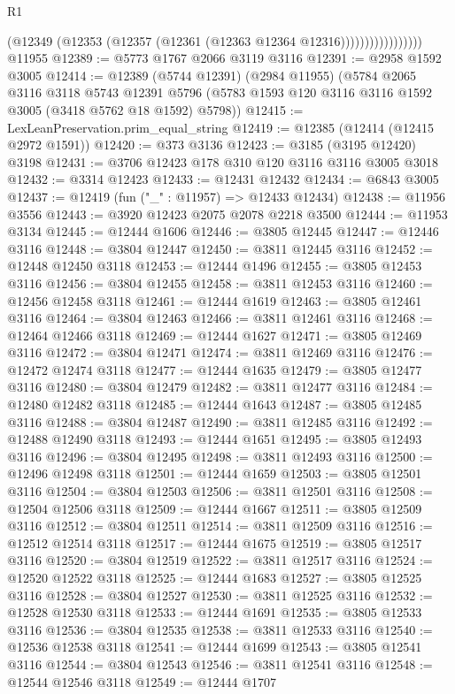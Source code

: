 \begin{lexlean}{R1}
\begin{coremodule}
                            (@12349 (@12353 (@12357 (@12361 (@12363 @12364 @12316)))))))))))))))))
    @11955
@12389 := @5773 @1767 @2066 @3119 @3116
@12391 := @2958 @1592 @3005
@12414 := @12389
    (@5744 @12391)
    (@2984 @11955)
    (@5784
      @2065
      @3116
      @3118
      @5743
      @12391
      @5796
      (@5783 @1593 @120 @3116 @3116 @1592 @3005 (@3418 @5762 @18 @1592) @5798))
@12415 := LexLeanPreservation.prim_equal_string
@12419 := @12385 (@12414 (@12415 @2972 @1591))
@12420 := @373 @3136
@12423 := @3185 (@3195 @12420) @3198
@12431 := @3706 @12423 @178 @310 @120 @3116 @3116 @3005 @3018
@12432 := @3314 @12423
@12433 := @12431 @12432
@12434 := @6843 @3005
@12437 := @12419 (fun ("_" : @11957) => @12433 @12434)
@12438 := @11956 @3556
@12443 := @3920 @12423 @2075 @2078 @2218 @3500
@12444 := @11953 @3134
@12445 := @12444 @1606
@12446 := @3805 @12445
@12447 := @12446 @3116
@12448 := @3804 @12447
@12450 := @3811 @12445 @3116
@12452 := @12448 @12450 @3118
@12453 := @12444 @1496
@12455 := @3805 @12453 @3116
@12456 := @3804 @12455
@12458 := @3811 @12453 @3116
@12460 := @12456 @12458 @3118
@12461 := @12444 @1619
@12463 := @3805 @12461 @3116
@12464 := @3804 @12463
@12466 := @3811 @12461 @3116
@12468 := @12464 @12466 @3118
@12469 := @12444 @1627
@12471 := @3805 @12469 @3116
@12472 := @3804 @12471
@12474 := @3811 @12469 @3116
@12476 := @12472 @12474 @3118
@12477 := @12444 @1635
@12479 := @3805 @12477 @3116
@12480 := @3804 @12479
@12482 := @3811 @12477 @3116
@12484 := @12480 @12482 @3118
@12485 := @12444 @1643
@12487 := @3805 @12485 @3116
@12488 := @3804 @12487
@12490 := @3811 @12485 @3116
@12492 := @12488 @12490 @3118
@12493 := @12444 @1651
@12495 := @3805 @12493 @3116
@12496 := @3804 @12495
@12498 := @3811 @12493 @3116
@12500 := @12496 @12498 @3118
@12501 := @12444 @1659
@12503 := @3805 @12501 @3116
@12504 := @3804 @12503
@12506 := @3811 @12501 @3116
@12508 := @12504 @12506 @3118
@12509 := @12444 @1667
@12511 := @3805 @12509 @3116
@12512 := @3804 @12511
@12514 := @3811 @12509 @3116
@12516 := @12512 @12514 @3118
@12517 := @12444 @1675
@12519 := @3805 @12517 @3116
@12520 := @3804 @12519
@12522 := @3811 @12517 @3116
@12524 := @12520 @12522 @3118
@12525 := @12444 @1683
@12527 := @3805 @12525 @3116
@12528 := @3804 @12527
@12530 := @3811 @12525 @3116
@12532 := @12528 @12530 @3118
@12533 := @12444 @1691
@12535 := @3805 @12533 @3116
@12536 := @3804 @12535
@12538 := @3811 @12533 @3116
@12540 := @12536 @12538 @3118
@12541 := @12444 @1699
@12543 := @3805 @12541 @3116
@12544 := @3804 @12543
@12546 := @3811 @12541 @3116
@12548 := @12544 @12546 @3118
@12549 := @12444 @1707

\end{coremodule}
\end{lexlean}
